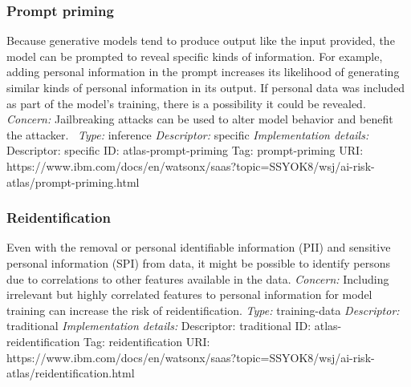 \documentclass{article}
\begin{document}
\subsubsection*{Prompt priming}
Because generative models tend to produce output like the input provided, the model can be prompted to reveal specific kinds of information. For example, adding personal information in the prompt increases its likelihood of generating similar kinds of personal information in its output. If personal data was included as part of the model's training, there is a possibility it could be revealed.\newline
\textit{Concern: }Jailbreaking attacks can be used to alter model behavior and benefit the attacker. \newline\newline
\textit{Type: }inference\newline
\textit{Descriptor: }specific \newline\newline
\textit{Implementation details:} \newline
Descriptor: specific \newline
ID: atlas-prompt-priming \newline
Tag: prompt-priming \newline
URI:  https://www.ibm.com/docs/en/watsonx/saas?topic=SSYOK8/wsj/ai-risk-atlas/prompt-priming.html\newline
\subsubsection*{Reidentification}
Even with the removal or personal identifiable information (PII) and sensitive personal information (SPI) from data, it might be possible to identify persons due to correlations to other features available in the data.\newline
\textit{Concern: }Including irrelevant but highly correlated features to personal information for model training can increase the risk of reidentification.\newline\newline
\textit{Type: }training-data\newline
\textit{Descriptor: }traditional \newline\newline
\textit{Implementation details:} \newline
Descriptor: traditional \newline
ID: atlas-reidentification \newline
Tag: reidentification \newline
URI:  https://www.ibm.com/docs/en/watsonx/saas?topic=SSYOK8/wsj/ai-risk-atlas/reidentification.html\newline
\end{document}
